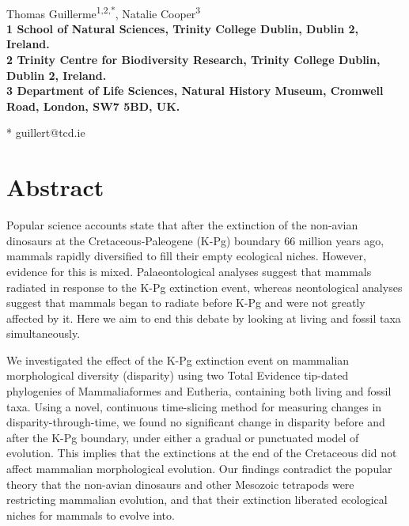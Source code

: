 \documentclass[10pt,letterpaper]{article}
\date{}
\begin{document}
\vspace*{0.35in}

\begin{flushleft}
{\Large
\textbf{}
}
\newline
\\
Thomas Guillerme\textsuperscript{1,2,*},
Natalie Cooper\textsuperscript{3}
\\
\bigskip
\bf{1} School of Natural Sciences, Trinity College Dublin, Dublin 2, Ireland.
\\
\bf{2} Trinity Centre for Biodiversity Research, Trinity College Dublin, Dublin 2, Ireland.
\\
\bf{3} Department of Life Sciences, Natural History Museum, Cromwell Road, London, SW7 5BD, UK.
\\
\bigskip

* guillert@tcd.ie

\end{flushleft}
\section*{Abstract}
Popular science accounts state that after the extinction of the non-avian dinosaurs at the Cretaceous-Paleogene (K-Pg) boundary 66 million years ago, mammals rapidly diversified to fill their empty ecological niches.
However, evidence for this is mixed. 
Palaeontological analyses suggest that mammals radiated in response to the K-Pg extinction event, whereas neontological analyses suggest that mammals began to radiate before K-Pg and were not greatly affected by it. 
Here we aim to end this debate by looking at living and fossil taxa simultaneously.

We investigated the effect of the K-Pg extinction event on mammalian morphological diversity (disparity) using two Total Evidence tip-dated phylogenies of Mammaliaformes and Eutheria, containing both living and fossil taxa. 
Using a novel, continuous time-slicing method for measuring changes in disparity-through-time, we found no significant change in disparity before and after the K-Pg boundary, under either a gradual or punctuated model of evolution.
This implies that the extinctions at the end of the Cretaceous did not affect mammalian morphological evolution. 
Our findings contradict the popular theory that the non-avian dinosaurs and other Mesozoic tetrapods were restricting mammalian evolution, and that their extinction liberated ecological niches for mammals to evolve into.
\end{document}
